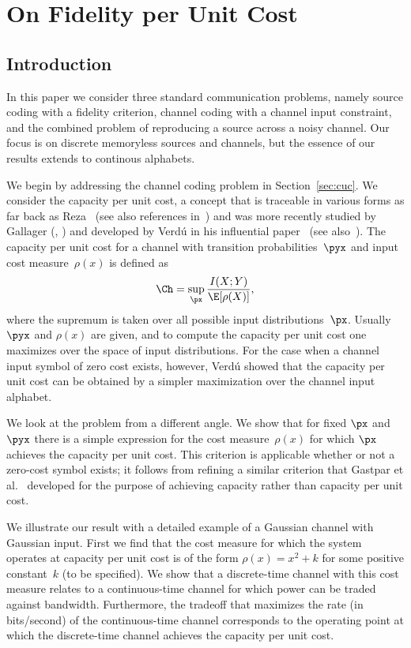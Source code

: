 \chapter{On Fidelity per Unit Cost}

\section{Introduction}

In this paper we consider three standard communication problems, namely source
coding with a fidelity criterion, channel coding  with a channel input
constraint, and the combined problem of reproducing a source across a noisy
channel. Our focus is on discrete memoryless sources and channels, but the
essence of our results extends to continous alphabets.

We begin by addressing the channel coding problem in Section~\ref{sec:cuc}. We
consider the capacity per unit cost, a concept that is traceable in various
forms as far back as Reza~\cite{Reza1961} (see also references
in~\cite{Verdu1990}) and was more recently studied by Gallager
(\cite{Gallager1988}, \cite[Ch.~14]{BlahutK2002}) and developed by Verd\'u in
his influential paper~\cite{Verdu1990} (see also~\cite{Verdu2002}). The capacity
per unit cost for a channel with transition probabilities~$\pyx$ and input cost
measure~$\rho(x)$ is defined as
\[ \Ch = \sup_{\px} \frac{I(X;Y)}{\E[\rho(X)]}, \]
where the supremum is taken over all possible input distributions~$\px$. 
Usually $\pyx$ and $\rho(x)$ are given, and to compute the capacity per unit
cost one maximizes over the space of input distributions. For the case when a
channel input symbol of zero cost exists, however, Verd\'u showed that the
capacity per unit cost can be obtained by a simpler maximization over the
channel input alphabet.

We look at the problem from a different angle. We show that for fixed $\px$ and
$\pyx$ there is a simple expression for the cost measure~$\rho(x)$ for which
$\px$ achieves the capacity per unit cost. This criterion is applicable whether
or not a zero-cost symbol exists; it follows from refining a similar criterion
that Gastpar et al.~\cite{GastparRV2003} developed for the purpose of achieving
capacity rather than capacity per unit cost.

We illustrate our result with a detailed example of a Gaussian channel with
Gaussian input.  First we find that the cost measure for which the system
operates at capacity per unit cost is of the form $\rho(x) = x^2 + k$ for some
positive constant~$k$ (to be specified). We show that a discrete-time channel
with this cost measure relates to a continuous-time channel for which power can
be traded against bandwidth.  Furthermore, the tradeoff that maximizes the rate
(in bits\slash second) of the continuous-time channel corresponds to the
operating point at which the discrete-time channel achieves the capacity per
unit cost.



